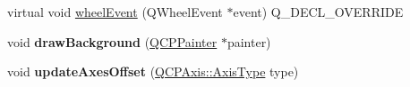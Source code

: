 \begin{DoxyCompactItemize}
\item 
virtual void \hyperlink{class_q_c_p_axis_rect_a2ca1c7bf10a472147df1b7d7bc6bfe93}{wheel\+Event} (Q\+Wheel\+Event $\ast$event) Q\+\_\+\+D\+E\+C\+L\+\_\+\+O\+V\+E\+R\+R\+I\+DE
\item 
\mbox{\label{class_q_c_p_axis_rect_ab49d338d1ce74b476fcead5b32cf06dc}} 
void {\bfseries draw\+Background} (\hyperlink{class_q_c_p_painter}{Q\+C\+P\+Painter} $\ast$painter)
\item 
\mbox{\label{class_q_c_p_axis_rect_a6024ccdc74f5dc0e8a0fe482e5b28a20}} 
void {\bfseries update\+Axes\+Offset} (\hyperlink{class_q_c_p_axis_ae2bcc1728b382f10f064612b368bc18a}{Q\+C\+P\+Axis\+::\+Axis\+Type} type)
\end{DoxyCompactItemize}

